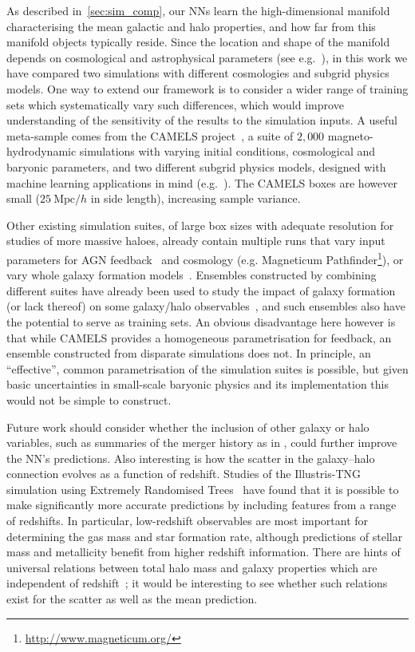 \documentclass[useAMS,usenatbib]{mnras}
\begin{document}
As described in~\cref{sec:sim_comp}, our \acp{NN} learn the high-dimensional manifold characterising the mean galactic and halo properties, and how far from this manifold objects typically reside. Since the location and shape of the manifold depends on cosmological and astrophysical parameters (see e.g.~\cite{Villaescusa2022SingleGalaxy}), in this work we have compared two simulations with different cosmologies and subgrid physics models.  One way to extend our framework is to consider a wider range of training sets which systematically vary such differences, which would improve understanding of the sensitivity of the results to the simulation inputs. A useful meta-sample comes from the CAMELS project~\citep{CAMELS_2021,CAMELS_2022}, a suite of $2,000$ magneto-hydrodynamic simulations with varying initial conditions, cosmological and baryonic parameters, and two different subgrid physics models, designed  with machine learning applications in mind (e.g.~\citealt{Villaescusa_Navarro_2021_marg}). The CAMELS boxes are however small ($25~\mathrm{Mpc}/h$ in side length), increasing sample variance.

Other existing simulation suites, of large box sizes with adequate resolution for studies of more massive haloes, already contain multiple runs that vary input parameters for AGN feedback~\citep[e.g.][]{McCarthy2017Bahamas} and cosmology (e.g. Magneticum Pathfinder\footnote{\url{http://www.magneticum.org/}}), or vary whole galaxy formation models~\citep[eg.][]{Cui2018The300}. Ensembles constructed by combining different suites have already been used to study the impact of galaxy formation (or lack thereof) on some galaxy/halo observables~\citep[e.g.][]{Anbajagane2020Stellar, Lim2021Gas, Ragagnin2021HOD, Anbajagane2022GalaxyVel}, and such ensembles also have the potential to serve as training sets. An obvious disadvantage here however is that while CAMELS provides a homogeneous parametrisation for feedback, an ensemble constructed from disparate simulations does not. In principle, an ``effective'', common parametrisation of the simulation suites is possible, but given basic uncertainties in small-scale baryonic physics and its implementation this would not be simple to construct.

Future work should consider whether the inclusion of other galaxy or halo variables, such as summaries of the merger history as in \cite{Yongseok_2019}, could further improve the NN's predictions. Also interesting is how the scatter in the galaxy--halo connection evolves as a function of redshift. Studies of the Illustris-TNG simulation using Extremely Randomised Trees~\citep{McGibbon} have found that it is possible to make significantly more accurate predictions by including features from a range of redshifts. In particular, low-redshift observables are most important for determining the gas mass and star formation rate, although predictions of stellar mass and metallicity benefit from higher redshift information. There are hints of universal relations between total halo mass and galaxy properties which are independent of redshift~\citep{Shao_2021}; it would be interesting to see whether such relations exist for the scatter as well as the mean prediction.
\end{document}
